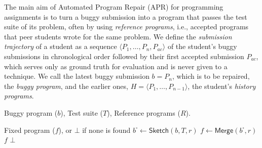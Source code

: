 \documentclass[10pt,conference]{IEEEtran}
\begin{document}
The main aim of Automated Program Repair (APR) for programming assignments is to turn a buggy submission into a program that passes the test suite of its problem, often by using \emph{reference programs}, i.e., accepted programs that peer students wrote for the same problem. We define the \emph{submission trajectory} of a student as a sequence $\langle P_1, \ldots, P_n, P_{\mathit{ac}} \rangle$ of the student's buggy submissions in chronological order followed by their first accepted submission $P_{\mathit{ac}}$, which serves only as ground truth for evaluation and is never given to a technique. We call the latest buggy submission $b = P_n$, which is to be repaired, the \emph{buggy program}, and the earlier ones, $H = \langle P_1, \ldots, P_{n-1} \rangle$, the student's \emph{history programs}.

\begin{algorithm}[h]
\caption{APR for Programming Assignments}\label{alg:generic}
\footnotesize
\begin{algorithmic}[1]
\item[\textbf{Input:}] Buggy program ($b$), Test suite ($T$), Reference programs ($R$).
\item[\textbf{Output:}] Fixed program ($f$), or $\bot$ if none is found
    \State $b^{\square} \gets \mathsf{Sketch}(b, T, r)$ 
    \State $f \gets \mathsf{Merge}(b^{\square}, r)$ 
      \State \Return $f$
    \EndIf
  \EndFor
  \State \Return $\bot$
\EndProcedure
\end{algorithmic}
\end{algorithm}
\end{document}
